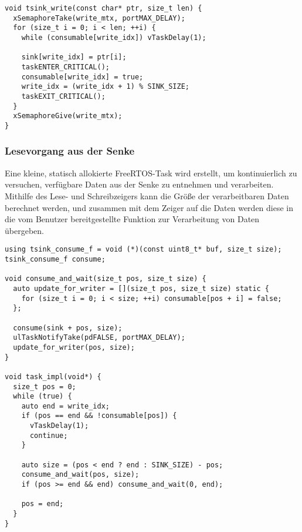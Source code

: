 \begin{code}
\begin{verbatim}
void tsink_write(const char* ptr, size_t len) {
  xSemaphoreTake(write_mtx, portMAX_DELAY);
  for (size_t i = 0; i < len; ++i) {
    while (consumable[write_idx]) vTaskDelay(1);

    sink[write_idx] = ptr[i];
    taskENTER_CRITICAL();
    consumable[write_idx] = true;
    write_idx = (write_idx + 1) % SINK_SIZE;
    taskEXIT_CRITICAL();
  }
  xSemaphoreGive(write_mtx);
}
\end{verbatim}
\end{code}

\subsubsection{Lesevorgang aus der Senke}

Eine kleine, statisch allokierte FreeRTOS-Task wird erstellt, um kontinuierlich
zu versuchen, verfügbare Daten aus der Senke zu entnehmen und verarbeiten.
Mithilfe des Lese- und Schreibzeigers kann die Größe der verarbeitbaren Daten
berechnet werden, und zusammen mit dem Zeiger auf die Daten werden diese in die
vom Benutzer bereitgestellte Funktion zur Verarbeitung von Daten übergeben.

\begin{code}
\begin{verbatim}
using tsink_consume_f = void (*)(const uint8_t* buf, size_t size);
tsink_consume_f consume;

void consume_and_wait(size_t pos, size_t size) {
  auto update_for_writer = [](size_t pos, size_t size) static {
    for (size_t i = 0; i < size; ++i) consumable[pos + i] = false;
  };

  consume(sink + pos, size);
  ulTaskNotifyTake(pdFALSE, portMAX_DELAY);
  update_for_writer(pos, size);
}

void task_impl(void*) {
  size_t pos = 0;
  while (true) {
    auto end = write_idx;
    if (pos == end && !consumable[pos]) {
      vTaskDelay(1);
      continue;
    }

    auto size = (pos < end ? end : SINK_SIZE) - pos;
    consume_and_wait(pos, size);
    if (pos >= end && end) consume_and_wait(0, end);

    pos = end;
  }
}
\end{verbatim}
    \label{code:consume}
\end{code}

